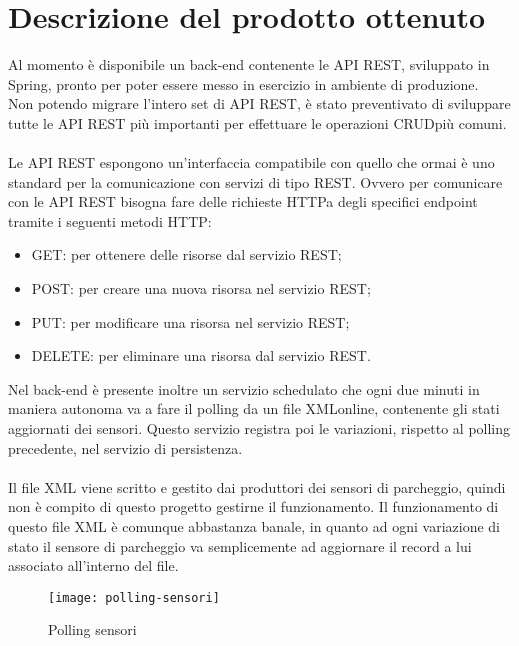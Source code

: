 \section{Descrizione del prodotto ottenuto}

Al momento è disponibile un \gls{back-end} contenente le \gls{API} \gls{REST}, sviluppato in Spring, pronto per
poter essere messo in esercizio in ambiente di produzione.
\\
Non potendo migrare l'intero set di \gls{API} \gls{REST}, è stato preventivato di sviluppare
tutte le \gls{API} \gls{REST} più importanti per effettuare le operazioni \gls{CRUD}\glsfirstoccur più
comuni.
\\\\
Le \gls{API} \gls{REST} espongono un'interfaccia compatibile con quello che ormai è uno standard per la
comunicazione con servizi di tipo \gls{REST}. Ovvero per comunicare con le \gls{API} \gls{REST} bisogna fare
delle richieste \gls{HTTP}\glsfirstoccur a degli specifici \gls{endpoint} tramite i seguenti metodi \gls{HTTP}:
\begin{itemize}
    \item GET: per ottenere delle risorse dal servizio \gls{REST};
    \item POST: per creare una nuova risorsa nel servizio \gls{REST};
    \item PUT: per modificare una risorsa nel servizio \gls{REST};
    \item DELETE: per eliminare una risorsa dal servizio \gls{REST}.
\end{itemize}
\leavevmode\newline
Nel \gls{back-end} è presente inoltre un servizio schedulato che ogni due minuti in maniera autonoma va a fare il polling
da un file \gls{XML}\glsfirstoccur online, contenente gli stati aggiornati dei sensori. Questo servizio registra poi 
le variazioni, rispetto
al polling precedente, nel servizio di persistenza.
\\\\
Il file \gls{XML} viene scritto e gestito dai produttori dei sensori di parcheggio, quindi non è compito di questo 
progetto gestirne il funzionamento. Il funzionamento di questo file \gls{XML} è comunque abbastanza banale,
in quanto ad ogni variazione di stato il sensore di parcheggio va semplicemente ad aggiornare 
il record a lui associato
all'interno del file.
\\
\begin{figure}[H]
    \centering
    \texttt{[image: polling-sensori]}
    \caption{Polling sensori}
\end{figure}
\leavevmode\newline
